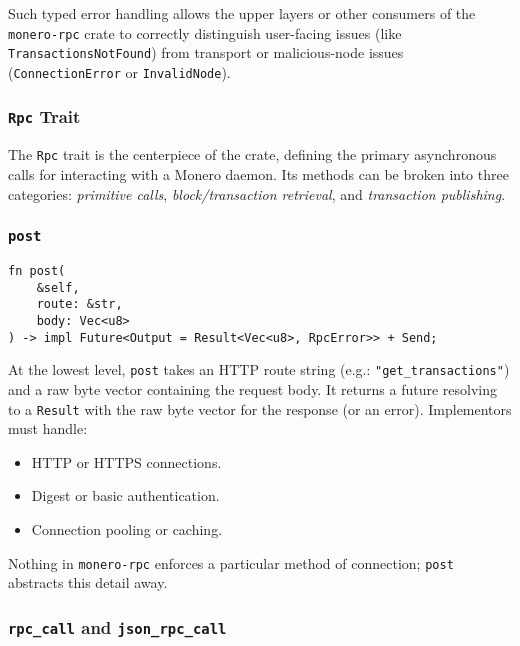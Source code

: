 Such typed error handling allows the upper layers or other consumers of the
\texttt{monero-rpc} crate to correctly distinguish user-facing issues (like
\texttt{TransactionsNotFound}) from transport or malicious-node issues
(\texttt{ConnectionError} or \texttt{InvalidNode}).

\subsubsection{\texttt{Rpc} Trait}
\label{sec:monero-rpc-rpc-trait}

The \texttt{Rpc} trait is the centerpiece of the crate, defining the primary
asynchronous calls for interacting with a Monero daemon.  Its methods can be
broken into three categories: \emph{primitive calls}, \emph{block/transaction
retrieval}, and \emph{transaction publishing}. %

\subsubsection{\texttt{post}}
\label{sec:monero-rpc-rpc-trait-post}

\begin{verbatim}
fn post(
    &self,
    route: &str,
    body: Vec<u8>
) -> impl Future<Output = Result<Vec<u8>, RpcError>> + Send;
\end{verbatim}

At the lowest level, \texttt{post} takes an HTTP route string (e.g.:
\texttt{"get\_transactions"}) and a raw byte vector containing the request body.
It returns a future resolving to a \texttt{Result} with the raw byte vector for
the response (or an error).  Implementors must handle:

\begin{itemize}
    \item HTTP or HTTPS connections.
    \item Digest or basic authentication.
    \item Connection pooling or caching.
\end{itemize}

Nothing in \texttt{monero-rpc} enforces a particular method of connection;
\texttt{post} abstracts this detail away.

\subsubsection{\texttt{rpc\_call} and \texttt{json\_rpc\_call}}
\label{sec:monero-rpc-rpc-trait-jsonrpc}

